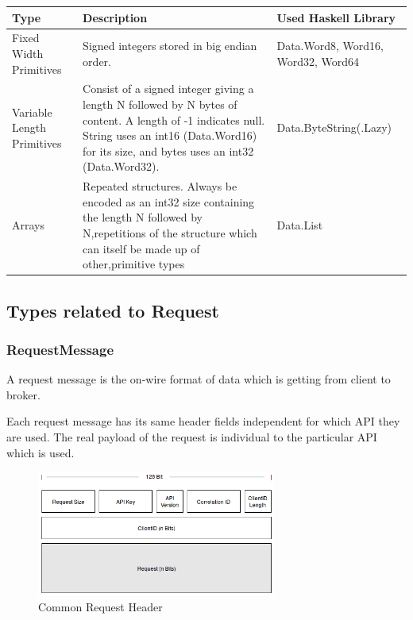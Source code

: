 \begin{table}[H]
    \begin{tabular}{| p{3cm}| p{7cm} | p{5cm} |}
\hline
\textbf{Type} & \textbf{Description} & \textbf{Used Haskell Library} \\ \hline
Fixed Width Primitives     & Signed integers stored in big endian order.
& Data.Word8, Word16, Word32, Word64 \\ \hline
Variable Length Primitives & Consist of a signed integer giving a length N
followed by N bytes of content. A length of -1 indicates null. String uses an
int16 (Data.Word16) for its size, and bytes uses an int32 (Data.Word32).    &
Data.ByteString(.Lazy) \\ \hline
Arrays                     & Repeated structures. Always be encoded as an int32
size containing the length N followed by N,repetitions of the structure which
can itself be made up of other,primitive types & Data.List                          \\ \hline
\end{tabular}
\end{table}

\subsection{Types related to Request}
\subsubsection{RequestMessage}
A request message is the on-wire format of data which is getting from client to
broker.

Each request message has its same header fields independent for which API they are used. 
The real payload of the request is individual to the particular API which is
used. 

\begin{figure}[H]
    \centering
    \includegraphics[width=0.7\textwidth]{images/protocol-request-header.png}
    \caption{Common Request Header}
    \label{fig:protocol-request-header.png}
\end{figure}

